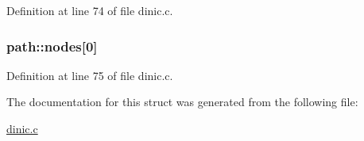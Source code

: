 Definition at line 74 of file dinic.c.

\hypertarget{structpath_ad7d7873e59ef82e10f73e8dbd8a6e5f8}{
\subsubsection[{nodes}]{ {\bf path::nodes}\mbox{[}0\mbox{]}}}
\label{structpath_ad7d7873e59ef82e10f73e8dbd8a6e5f8}


Definition at line 75 of file dinic.c.



The documentation for this struct was generated from the following file:\begin{DoxyCompactItemize}
\item 
\hyperlink{dinic_8c}{dinic.c}\end{DoxyCompactItemize}
